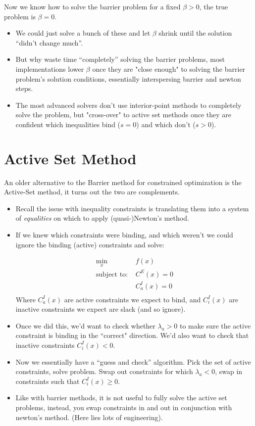 \documentclass[twoside]{article}
\begin{document}
Now we know how to solve the barrier problem for a fixed $\beta > 0$, the true problem is $\beta = 0$. 
\begin{itemize}
\item We could just solve a bunch of these and let $\beta$ shrink until the solution ``didn't change much''. 
\item But why waste time ``completely'' solving the barrier problems, most implementations lower $\beta$ once they are "close enough" to solving the barrier problem's solution conditions, essentially interspersing barrier and newton steps. 
\item The most advanced solvers don't use interior-point methods to completely solve the problem, but "cross-over" to active set methods once they are confident which inequalities bind ($s = 0$) and which don't ($s > 0$). 
\end{itemize}

\section{Active Set Method}

An older alternative to the Barrier method for constrained optimization is the Active-Set method, it turns out the two are complements. 

\begin{itemize}
\item Recall the issue with inequality constraints is translating them into a system of \emph{equalities} on which to apply (quasi-)Newton's method. 
\item If we knew which constraints were binding, and which weren't we could ignore the binding (active) constraints and solve: 

\begin{align*}
\min_x & f(x) \\
\mbox{subject to: } & C^E(x) = 0 \\
& C_a^I(x) = 0 \\ 
\end{align*}
Where $C_a^I(x)$ are active constraints we expect to bind, and $C_i^I(x)$ are inactive constraints we expect are slack (and so ignore). 

\item Once we did this, we'd want to check whether $\lambda_a > 0$ to make sure the active constraint is binding in the ``correct" direction. We'd also want to check that inactive constraints $C_i^I(x) < 0$. 
\item Now we essentially have a ``guess and check'' algorithm. Pick the set of active constraints, solve problem. Swap out constraints for which $\lambda_a < 0$, swap in constraints such that $C_i^I(x) \geq 0$.
\item Like with barrier methods, it is not useful to fully solve the active set problems, instead, you swap constraints in and out in conjunction with newton's method. (Here lies lots of engineering). 
\end {itemize} 
\end{document}
